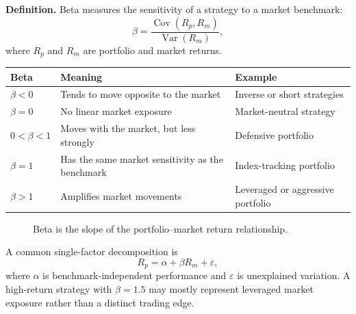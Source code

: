 \documentclass[12pt,openany]{book}
\theoremstyle{definition}
\theoremstyle{remark}
\begin{document}
\textbf{Definition.} Beta measures the sensitivity of a strategy to a market
benchmark:
\[
\beta=\frac{\operatorname{Cov}(R_p,R_m)}
            {\operatorname{Var}(R_m)},
\]
where \(R_p\) and \(R_m\) are portfolio and market returns.

\begin{center}
\small
\begin{tabular}{|L{0.15\textwidth}|L{0.40\textwidth}|L{0.28\textwidth}|}
\hline
\textbf{Beta} & \textbf{Meaning} & \textbf{Example} \\ \hline
\(\beta<0\) & Tends to move opposite to the market & Inverse or short strategies \\ \hline
\(\beta=0\) & No linear market exposure & Market-neutral strategy \\ \hline
\(0<\beta<1\) & Moves with the market, but less strongly & Defensive portfolio \\ \hline
\(\beta=1\) & Has the same market sensitivity as the benchmark & Index-tracking portfolio \\ \hline
\(\beta>1\) & Amplifies market movements & Leveraged or aggressive portfolio \\ \hline
\end{tabular}
\end{center}

\begin{figure}[H]
\centering
{}
\caption{Beta is the slope of the portfolio--market return relationship.}
\label{fig:beta-lines}
\end{figure}

A common single-factor decomposition is
\[
R_p=\alpha+\beta R_m+\varepsilon,
\]
where \(\alpha\) is benchmark-independent performance and \(\varepsilon\)
is unexplained variation. A high-return strategy with \(\beta=1.5\) may
mostly represent leveraged market exposure rather than a distinct trading
edge.
\end{document}
